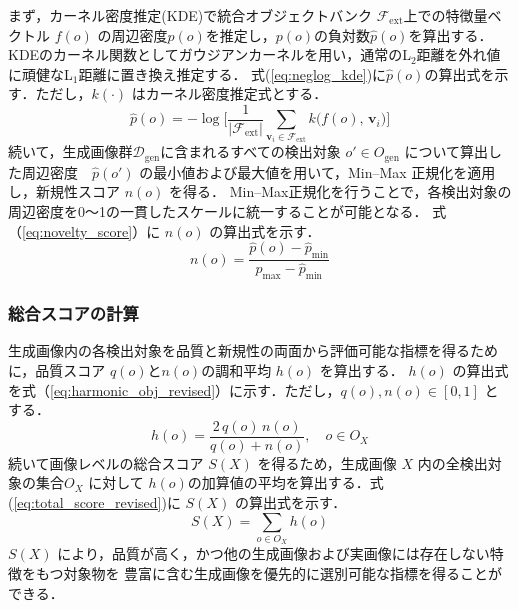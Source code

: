 \documentclass[Japanese]{dicomopapers}
\begin{document}
    まず，カーネル密度推定(KDE)で統合オブジェクトバンク \(\mathcal{F}_{\mathrm{ext}}\)上での特徴量ベクトル \(f(o)\)
    の周辺密度\(p(o)\)を推定し，\(p(o)\)の負対数\(\hat p(o)\)を算出する．
    KDEのカーネル関数としてガウジアンカーネルを用い，通常のL\(_2\)距離を外れ値に頑健なL\(_1\)距離に置き換え推定する．
    式(\ref{eq:neglog_kde})に\(\hat p(o)\)の算出式を示す．ただし，\(k(\cdot )\) はカーネル密度推定式とする．
    \begin{equation}
      \hat p(o)
      = -\log\!\biggl[
          \frac{1}{\lvert\mathcal{F}_{\mathrm{ext}}\rvert}
          \sum_{\mathbf v_i\in\mathcal{F}_{\mathrm{ext}}}
          k\bigl(f(o),\,\mathbf v_i\bigr)
        \biggr]
      \label{eq:neglog_kde}
    \end{equation}
    続いて，生成画像群$\mathcal{D}_{\mathrm{gen}}$に含まれるすべての検出対象 \(o'\in O_{\mathrm{gen}}\) 
    について算出した周辺密度　\(\hat p(o')\) の最小値および最大値を用いて，Min–Max 正規化を適用し，新規性スコア \(n(o)\) を得る．
    Min–Max正規化を行うことで，各検出対象の周辺密度を0～1の一貫したスケールに統一することが可能となる．
    式（\ref{eq:novelty_score}）に \(n(o)\) の算出式を示す．
    \begin{equation}
      n(o)=\frac{\hat p(o)-\hat p_{\min}}
                  {\hat p_{\max}-\hat p_{\min}}
      \label{eq:novelty_score}
    \end{equation} 
    \subsubsection{総合スコアの計算}

    生成画像内の各検出対象を品質と新規性の両面から評価可能な指標を得るために，品質スコア
    \( q(o)\)と\(n(o)\)の調和平均 \(h(o)\) を算出する．
     \(h(o)\) の算出式を式（\ref{eq:harmonic_obj_revised}）に示す．ただし，\(q(o), n(o)\in[0,1]\) とする．
    \begin{equation}
      h(o)
      = \frac{2\,q(o)\,n(o)}{q(o) + n(o)},\quad o\in O_X
      \label{eq:harmonic_obj_revised}
    \end{equation}
    続いて画像レベルの総合スコア \(S(X)\) を得るため，生成画像 \(X\) 内の全検出対象の集合\(O_X\) に対して
    \(h(o)\)の加算値の平均を算出する．式(\ref{eq:total_score_revised})に \(S(X)\) の算出式を示す．
    \begin{equation}
      S(X)=\sum_{o\in O_X} h(o)
      \label{eq:total_score_revised}
    \end{equation}      
    \(S(X)\) により，品質が高く，かつ他の生成画像および実画像には存在しない特徴をもつ対象物を
    豊富に含む生成画像を優先的に選別可能な指標を得ることができる．
\end{document}
